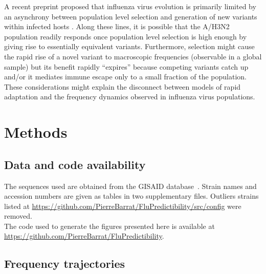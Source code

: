 \documentclass[reprint,amsmath,amssymb,superscriptaddress,showpacs,rmp]{revtex4-1}
\begin{document}
A recent preprint proposed that influenza virus evolution is primarily limited by an asynchrony between population level selection and generation of new variants within infected hosts \citep{morris_asynchrony_2020}.
Along these lines, it is possible that the A/H3N2 population readily responds once population level selection is high enough by giving rise to essentially equivalent variants.
Furthermore, selection might cause the rapid rise of a novel variant to macroscopic frequencies (observable in a global sample) but its benefit rapidly ``expires'' because competing variants catch up and/or it mediates immune escape only to a small fraction of the population.
These considerations might explain the disconnect between models of rapid adaptation and the frequency dynamics observed in influenza virus populations.



\section*{Methods} %
\label{sec:methods}

\subsection*{Data and code availability} %
\label{sub:data}
	The sequences used are obtained from the GISAID database~\cite{shu2017gisaid}.
	Strain names and accession numbers are given as tables in two supplementary files. Outliers strains listed at \url{https://github.com/PierreBarrat/FluPredictibility/src/config} were removed. \\
	The code used to generate the figures presented here is available at \url{https://github.com/PierreBarrat/FluPredictibility}.

\subsection*{Frequency trajectories} %
\label{sub:frequency_trajectories}
\end{document}
